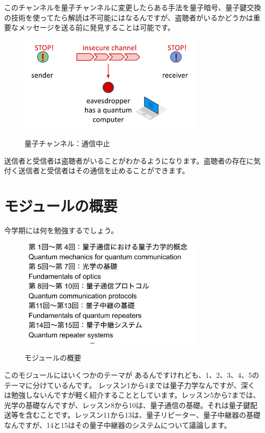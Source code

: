 このチャンネルを量子チャンネルに変更したらある手法を量子暗号、量子鍵交換の技術を使ってたら解読は不可能にはなるんですが、盗聴者がいるかどうかは重要なメッセージを送る前に発見することは可能です。
\begin{figure}[H]
    \centering
    \includegraphics[width=0.8\textwidth]{lesson1/insecure_channel_stop.pdf}
    \label{fig: 1}
    \begin{center}
        \caption{量子チャンネル：通信中止}
    \end{center}
\end{figure}
送信者と受信者は盗聴者がいることがわかるようになります。盗聴者の存在に気付く送信者と受信者はその通信を止めることができます。


\section{モジュールの概要}


今学期には何を勉強するでしょう。
\begin{figure}[H]
    \centering
    \includegraphics[width=0.8\textwidth]{lesson1/module_overview.pdf}
    \label{fig: 1}
    \begin{center}
        \caption{モジュールの概要}
    \end{center}
\end{figure}
このモジュールにはいくつかのテーマが
あるんですけれども、1、2、3、4、5のテーマに分けているんです。
レッスン1から4までは量子力学なんですが、深くは勉強しないんですが軽く紹介することとしています。レッスン5から7までは、光学の基礎なんですが、レッスン8から10は、量子通信の基礎。それは量子鍵配送等を含むことです。レッスン11から13は、量子リピーター、量子中継器の基礎なんですが、14と15はその量子中継器のシステムについて議論します。
